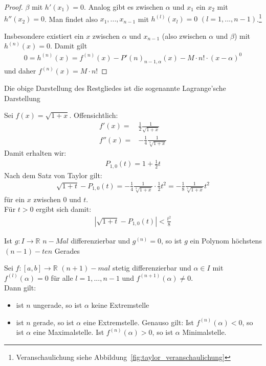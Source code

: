 \begin{proof}
	$\beta$ mit $h'(x_1) = 0$. Analog gibt es zwischen $\alpha$ und 
	$x_1$ ein $x_2$ mit $h''(x_2) = 0$. Man findet also $x_1, ..., x_{n-1}$ mit 
	$h^{(l)}(x_l) = 0$ $( l = 1, ..., n-1)$.\footnote{Veranschaulichung siehe Abbildung~\ref{fig:taylor_veranschaulichung}}

	Insbesondere existiert ein $x$ 
	zwischen $\alpha$ und $x_{n-1}$ (also zwischen $\alpha$ und $\beta$) mit 
	$h^{(n)}(x) = 0$. Damit gilt 
	\begin{align*}
		0 = h^{(n)}(x) = f^{(n)}(x) - P'(n)_{n-1, \alpha}(x) - M \cdot n! \cdot 
		(x-\alpha)^0
	\end{align*}{}
	und daher $f^{(n)}(x) = M \cdot n!$
\end{proof}	

\begin{Bemerkung}{
	Die obige Darstellung des Restgliedes ist die sogenannte 
	Lagrange'sche Darstellung
}\end{Bemerkung}


\begin{Beispiel}{
	Sei $f(x) = \sqrt{1 +x}$. Offensichtlich: 
	\begin{align*}
		f'(x) = & \frac{1}{2} \frac{1}{\sqrt{1+x}} \\
		f''(x) = & -\frac{1}{4} \frac{1}{\sqrt[3]{1+x}}
	\end{align*}
	Damit erhalten wir: 
	\begin{align*}
		P_{1,0}(t) = 1 + \frac{1}{2}t
	\end{align*}
	Nach dem Satz von Taylor gilt:
	\begin{align*}
		\sqrt{1 +t} - P_{1, 0}(t) = -\frac{1}{4} \frac{1}{\sqrt[3]{1+x}} \cdot
		 \frac{1}{2}t^2 = -\frac{1}{8}\frac{1}{\sqrt[3]{1+x}}t	^2
	\end{align*}
	für ein $x$ zwischen $0$ und $t$. \\
	Für $t > 0$ ergibt sich damit: 
	\begin{align*}
		\left\vert \sqrt{1 + t} - P_{1,0}(t)\right\vert < \frac{t^2}{8}
	\end{align*}
	
}\end{Beispiel}

\begin{Korollar}{
	Ist $g: I \rightarrow \mathbb{R}$ $n-Mal$ differenzierbar und 
	$g^{(n)} = 0$, so ist $g$ ein Polynom höchstens $(n-1)-ten$ Gerades
}\end{Korollar}

\begin{Korollar}{
	Sei $f: [a,b] \rightarrow \mathbb{R}$ $(n+1)-mal$ stetig differenzierbar 
	und $\alpha \in I$ mit $f^{(l)}(\alpha) = 0$ für alle $ l = 1, ..., n-1$ und 
	$f^{(n+1)}(\alpha) \neq 0$. \\
	Dann gilt:
	\begin{itemize}
		\item ist $n$ ungerade, so ist $\alpha$ keine Extremstelle
		\item ist $n$ gerade, so ist $\alpha$ eine Extremstelle.
			Genauso gilt: Ist $f^{(n)}(\alpha) < 0$, so ist 
			$\alpha$ eine Maximalstelle. Ist $f^{(n)}(\alpha)>0$, so ist 
			$\alpha$ Minimalstelle.
	\end{itemize}
}\end{Korollar}

